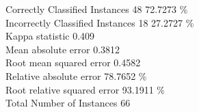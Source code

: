 \begin{enumerate}
Correctly Classified Instances          48      \hspace*{20 mm}         72.7273 \%\\
Incorrectly Classified Instances        18      \hspace*{20 mm}        27.2727 \%\\
Kappa statistic                          0.409 \\
Mean absolute error                      0.3812\\
Root mean squared error                  0.4582\\
Relative absolute error                 78.7652 \%\\
Root relative squared error             93.1911 \%\\
Total Number of Instances               66 \\   


\end{enumerate}



